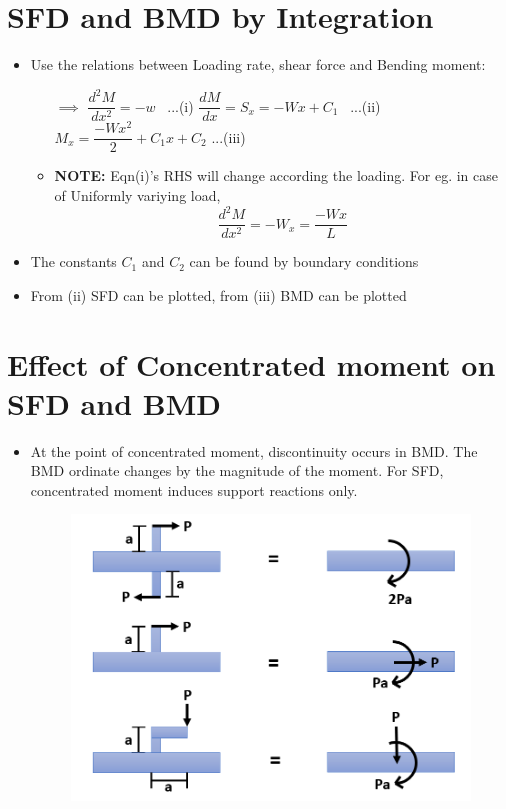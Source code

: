 \documentclass[8pt]{report}
\begin{document}
	\section{SFD and BMD by Integration}
		\begin{itemize}
			\item Use the relations between Loading rate, shear force and Bending moment:
				\begin{itemize}
					\item[$\implies$] $\boxed{\dfrac{d^2M}{dx^2}=-w}\;\;\;$...(i)  $\boxed{\dfrac{dM}{dx}=S_x=-Wx+C_1}\;\;\;$...(ii)  $\boxed{M_x = \dfrac{-Wx^2}{2} + C_1x + C_2}$   ...(iii)
					\item \textbf{NOTE: } Eqn(i)'s RHS will change according the loading. For eg. in case of Uniformly variying load, $$\boxed{\dfrac{d^2M}{dx^2}= -W_x = \dfrac{-Wx}{L}}$$
				\end{itemize}
			\item The constants $C_1$ and $C_2$ can be found by boundary conditions
			\item From (ii) SFD can be plotted, from (iii) BMD can be plotted
		\end{itemize}\hrulefill
	\section{Effect of Concentrated moment on SFD and BMD}
		\begin{itemize}
			\item At the point of concentrated moment, discontinuity occurs in BMD. The BMD ordinate changes by the magnitude of the moment. For SFD, concentrated moment induces support reactions only.
			\begin{figure}[H]
				\centering
				\includegraphics[scale=0.5]{concmoment}
			\end{figure}
		\end{itemize}\hrulefill	%
\end{document}
